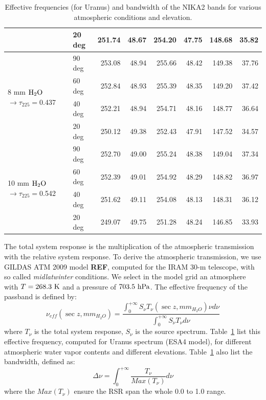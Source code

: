 \begin{table}[th]
\begin{center}
\begin{tabular}{|l|l|r|r|r|r|r|r|}
 & 20 deg & 251.74 & 48.67 & 254.20 & 47.75 & 148.68 & 35.82 \\
\hline
\multirow{4}{*}{8 mm $\rm H_2O$ $\rightarrow \tau_{225}=$0.437} & 90 deg &  253.08 & 48.94 & 255.66 & 48.42 & 149.38 & 37.76 \\
 & 60 deg & 252.84 & 48.93 & 255.39 & 48.35 & 149.20 & 37.42 \\
 & 40 deg & 252.21 & 48.94 & 254.71 & 48.16 & 148.77 & 36.64 \\
 & 20 deg & 250.12 & 49.38 & 252.43 & 47.91 & 147.52 & 34.57 \\
\hline
\multirow{4}{*}{10 mm $\rm H_2O$ $\rightarrow \tau_{225}=$0.542} & 90 deg &  252.70 & 49.00 & 255.24 & 48.38 & 149.04 & 37.34 \\
 & 60 deg & 252.39 & 49.01 & 254.92 & 48.29 & 148.82 & 36.97 \\
 & 40 deg & 251.62 & 49.11 & 254.08 & 48.13 & 148.31 & 36.12 \\
 & 20 deg & 249.07 & 49.75 & 251.28 & 48.24 & 146.85 & 33.93 \\
\hline
\end{tabular}
\caption{Effective frequencies (for Uranus) and bandwidth of the NIKA2 bands for
  various atmospheric conditions and elevation.}
\label{tab:bandwidths}
\end{center}
\end{table}


The total system response is the multiplication of the atmospheric
transmission with the relative system response. To derive the
atmospheric transmission, we use GILDAS ATM 2009 model {\bf REF}, computed for
the IRAM 30-m telescope, with so called {\it midlatwinter} conditions. We select in the model
grid an atmosphere with $T=268.3 \ {\rm K}$ and a pressure of $703.5 \ {\rm hPa}$. The
effective frequency of the passband is defined by:
\begin{equation}
\nu_{eff}( \sec z, mm_{H_{2}O}) = \frac{ \int_{0}^{+\infty} S_{\nu}
  T_{\nu}(\sec z, mm_{H_{2}O}) \nu d\nu } { \int_{0}^{+\infty} S_{\nu} T_{\nu} d\nu}
\label{eq:nueff0}
\end{equation}
where $T_{\nu}$ is the total system response, $S_{\nu}$ is the source
spectrum. Table~\ref{tab:bandwidths} list this effective frequency,
computed for Uranus spectrum (ESA4 model), for different atmospheric
water vapor contents and different elevations. 
Table~\ref{tab:bandwidths} also list the bandwidth, defined as:
\begin{equation}
\Delta\nu = \int_{0}^{+\infty} \frac{T_{\nu}}{Max(T_{\nu})}
d\nu
\end{equation}
where the $Max(T_{\nu})$ ensure the RSR span the whole 0.0 to 1.0 range.


